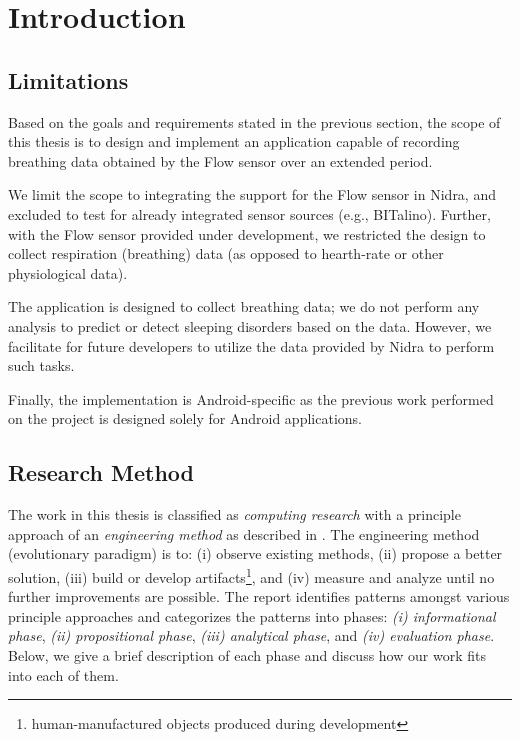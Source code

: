 \chapter{Introduction}\label{introduction}




\section{Limitations}
Based on the goals and requirements stated in the previous section, the scope of this thesis is to design and implement an application capable of recording breathing data obtained by the Flow sensor over an extended period. 

We limit the scope to integrating the support for the Flow sensor in Nidra, and excluded to test for already integrated sensor sources (e.g., BITalino). Further, with the Flow sensor provided under development, we restricted the design to collect respiration (breathing) data (as opposed to hearth-rate or other physiological data).

The application is designed to collect breathing data; we do not perform any analysis to predict or detect sleeping disorders based on the data. However, we facilitate for future developers to utilize the data provided by Nidra to perform such tasks.

Finally, the implementation is Android-specific as the previous work performed on the project is designed solely for Android applications. 

\section{Research Method}
The work in this thesis is classified as \textit{computing research} with a principle approach of an \textit{engineering method} as described in \cite{Glass_1995}. The engineering method (evolutionary paradigm) is to: (i) observe existing methods, (ii) propose a better solution, (iii)  build or develop artifacts\footnote{human-manufactured objects produced during development}, and (iv) measure and analyze until no further improvements are possible. The report identifies patterns amongst various principle approaches and categorizes the patterns into phases: \textit{(i) informational phase}, \textit{(ii) propositional phase}, \textit{(iii) analytical phase}, and \textit{(iv) evaluation phase}. Below, we give a brief description of each phase and discuss how our work fits into each of them. 

